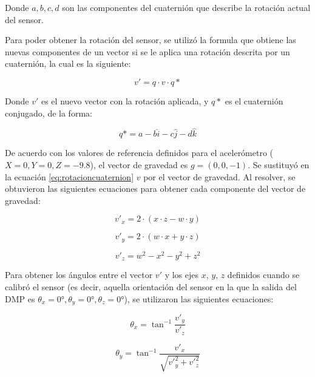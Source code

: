 Donde $a, b, c, d$ son las componentes del cuaternión que describe la rotación actual del sensor.

Para poder obtener la rotación del sensor, se utilizó la formula que obtiene las nuevas componentes de un vector si se le aplica una rotación descrita por un cuaternión, la cual es la siguiente:

\begin{equation}
	v' = q\cdot v\cdot q*
	\label{eq:rotacioncuaternion}
\end{equation}

Donde $v'$ es el nuevo vector con la rotación aplicada, y $q*$ es el cuaternión conjugado, de la forma:

\begin{equation}
	q* = a - b\hat{i} - c\hat{j} - d\hat{k}
	\label{eq:eqcuaternionconj}
\end{equation}

De acuerdo con los valores de referencia definidos para el acelerómetro ($X=0, Y=0, Z=-9.8$), el vector de gravedad es $g = (0, 0, -1)$. Se sustituyó en la ecuación \ref{eq:rotacioncuaternion} $v$ por el vector de gravedad. Al resolver, se obtuvieron las siguientes ecuaciones para obtener cada componente del vector de gravedad:

\begin{equation}
	v'_x = 2\cdot(x \cdot z - w \cdot y)
	\label{eq:componentex}
\end{equation}

\begin{equation}
	v'_y = 2\cdot(w \cdot x + y \cdot z)
	\label{eq:componentey}
\end{equation}

\begin{equation}
	v'_z = w^2 - x^2 - y^2 + z^2
	\label{eq:componentez}
\end{equation}

Para obtener los ángulos entre el vector $v'$ y los ejes $x$, $y$, $z$ definidos cuando se calibró el sensor (es decir, aquella orientación del sensor en la que la salida del DMP es $\theta_x = 0°,\theta_y = 0°,\theta_z = 0°$), se utilizaron las siguientes ecuaciones:

\begin{equation}
	\theta_x = \tan^{-1}\frac{v'_y}{v'_z}
	\label{eq:angulox}
\end{equation}

\begin{equation}
	\theta_y = \tan^{-1}\frac{v'_x}{\sqrt{v'^2_y + v'^2_z}}
	\label{eq:anguloy}
\end{equation}

